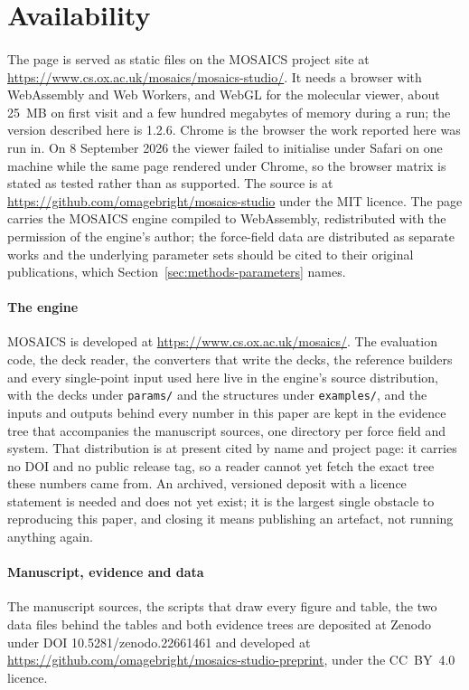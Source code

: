 \section{Availability}
\label{sec:availability}

\paragraph{\studio{}}
The page is served as static files on the MOSAICS project site at
\url{https://www.cs.ox.ac.uk/mosaics/mosaics-studio/}. It needs a browser with
WebAssembly and Web Workers, and WebGL for the molecular viewer, about 25~MB on
first visit and a few hundred megabytes of memory during a run; the version
described here is 1.2.6. Chrome is the browser the work reported here was run
in. On 8 September 2026 the viewer failed to initialise under Safari on one
machine while the same page rendered under Chrome, so the browser matrix is
stated as tested rather than as supported. The source is at
\url{https://github.com/omagebright/mosaics-studio} under the MIT licence. The
page carries the MOSAICS engine compiled to WebAssembly, redistributed with the
permission of the engine's author; the force-field data are distributed as
separate works and the underlying parameter sets should be cited to their
original publications, which Section~\ref{sec:methods-parameters} names.

\paragraph{The engine}
MOSAICS \cite{mosaics-software} is developed at
\url{https://www.cs.ox.ac.uk/mosaics/}. The evaluation code, the deck reader,
the converters that write the decks, the reference builders and every
single-point input used here live in the engine's source distribution, with
the decks under \texttt{params/} and the structures under \texttt{examples/},
and the inputs and outputs behind every number in this paper are kept in the
evidence tree that accompanies the manuscript sources, one directory per force
field and system. That distribution is at present cited by name and project
page: it carries no DOI and no public release tag, so a reader cannot yet fetch
the exact tree these numbers came from. An archived, versioned deposit with a
licence statement is needed and does not yet exist; it is the largest single
obstacle to reproducing this paper, and closing it means publishing an
artefact, not running anything again.

\paragraph{Manuscript, evidence and data}
The manuscript sources, the scripts that draw every figure and table, the two
data files behind the tables and both evidence trees are deposited at Zenodo
under DOI 10.5281/zenodo.22661461 and developed at
\url{https://github.com/omagebright/mosaics-studio-preprint}, under the
CC~BY~4.0 licence.

